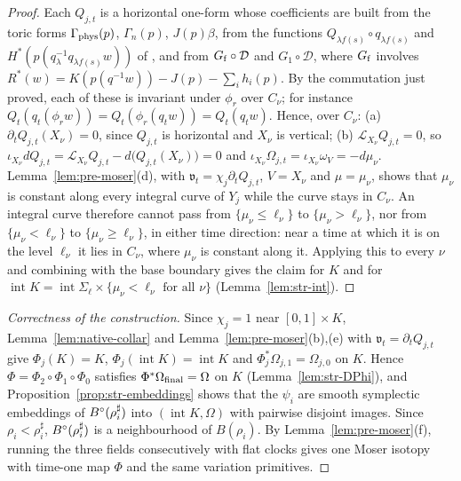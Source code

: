 \begin{proof}
Each $Q_{j,t}$ is a horizontal one-form whose coefficients are built from the toric forms $\Gamma_{\rm phys}(p)$, $\Gamma_n(p)$, $J(p)\beta$,
from the functions $Q_{\lambda f(s)}\circ q_{\lambda f(s)}$ and $H^*(p(q_\lambda^{-1}q_{\lambda f(s)}w))$ of , and
from $G_{\rm f}\circ\mathcal D$ and $G_1\circ\mathcal D$, where $G_{\rm f}$ involves $R^*(w)=K(p(q^{-1}w))-J(p)-\sum_ih_i(p)$. By the
commutation just proved, each of these is invariant under $\phi_r$ over $C_\nu$; for instance
$Q_t(q_t(\phi_rw))=Q_t(\phi_r(q_tw))=Q_t(q_tw)$. Hence, over $C_\nu$: (a) $\partial_tQ_{j,t}(X_\nu)=0$, since $Q_{j,t}$ is horizontal and
$X_\nu$ is vertical; (b) $\mathcal L_{X_\nu}Q_{j,t}=0$, so $\iota_{X_\nu}dQ_{j,t}=\mathcal L_{X_\nu}Q_{j,t}-d\bigl(Q_{j,t}(X_\nu)\bigr)=0$ and
$\iota_{X_\nu}\Omega_{j,t}=\iota_{X_\nu}\omega_V=-d\mu_\nu$. Lemma~\ref{lem:pre-moser}(d), with $\mathfrak v_t=\chi_j\partial_tQ_{j,t}$, $V=X_\nu$
and $\mu=\mu_\nu$, shows that $\mu_\nu$ is constant along every integral curve of $Y_j$ while the curve stays in $C_\nu$. An integral
curve therefore cannot pass from $\{\mu_\nu\le\ell_\nu\}$ to $\{\mu_\nu>\ell_\nu\}$, nor from $\{\mu_\nu<\ell_\nu\}$ to $\{\mu_\nu\ge\ell_\nu\}$, in
either time direction: near a time at which it is on the level $\ell_\nu$ it lies in $C_\nu$, where $\mu_\nu$ is constant along it.
Applying this to every $\nu$ and combining with the base boundary gives the claim for $K$ and for
$\operatorname{int}K=\operatorname{int}\Sigma_\ell\times\{\mu_\nu<\ell_\nu\text{ for all }\nu\}$ (Lemma~\ref{lem:str-int}).
\end{proof}

\begin{proof}[Correctness of the construction]
Since $\chi_j=1$ near $[0,1]\times K$, Lemma~\ref{lem:native-collar} and
Lemma~\ref{lem:pre-moser}(b),(e) with $\mathfrak v_t=\partial_tQ_{j,t}$ give
$\Phi_j(K)=K$, $\Phi_j(\operatorname{int}K)=\operatorname{int}K$ and $\Phi_j^*\Omega_{j,1}=\Omega_{j,0}$ on $K$. Hence
$\Phi=\Phi_2\circ\Phi_1\circ\Phi_0$ satisfies $\Phi^*\Omega_{\rm final}=\Omega$ on $K$ (Lemma~\ref{lem:str-DPhi}), and
Proposition~\ref{prop:str-embeddings} shows that the $\psi_i$ are smooth symplectic embeddings of $B^{\circ}(\rho_i^\sharp)$ into
$(\operatorname{int}K,\Omega)$ with pairwise disjoint images. Since $\rho_i<\rho_i^\sharp$, $B^{\circ}(\rho_i^\sharp)$ is a neighbourhood of
$B(\rho_i)$. By Lemma~\ref{lem:pre-moser}(f), running the three fields consecutively with flat clocks gives one Moser isotopy
with time-one map $\Phi$ and the same variation primitives.
\end{proof}
